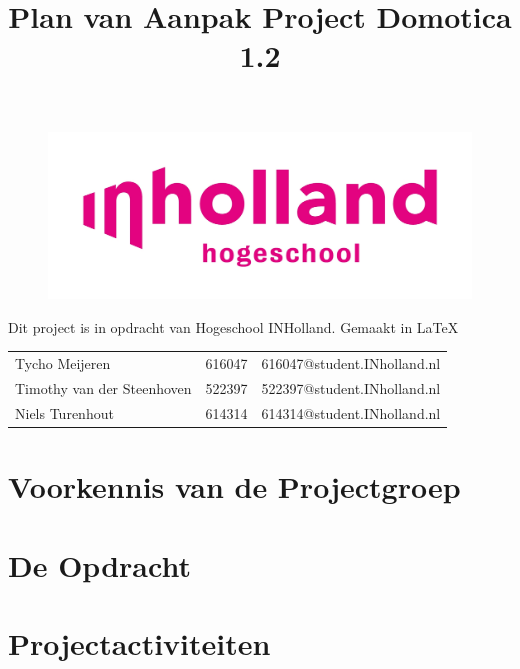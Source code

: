 \documentclass[11pt]{article}
\title{Plan van Aanpak Project Domotica 1.2}
\date{} %
\begin{document}
\thispagestyle{empty}
\maketitle %

\begin{figure}[h]
	\centering
	\includegraphics[width=\textwidth]{inholland}
\end{figure}

\vspace{20mm} %

\center Dit project is in opdracht van Hogeschool INHolland. \center Gemaakt in \LaTeX 

	\vspace{10mm}

\begin{tabular} {l c c} %
	
	Tycho Meijeren & 616047& 616047@student.INholland.nl\\
	
	Timothy van der Steenhoven & 522397 & 522397@student.INholland.nl\\
	
	Niels Turenhout & 614314 & 614314@student.INholland.nl
\end{tabular}


\newpage

\tableofcontents
\thispagestyle{empty}

\newpage

\section[Voorkennis]{Voorkennis van de Projectgroep}
\newpage
\section{De Opdracht}
\newpage
\section{Projectactiviteiten}
\end{document}
